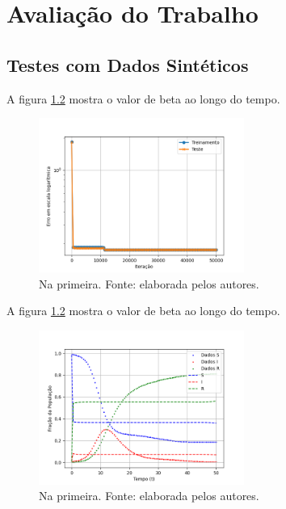 \chapter{Avaliação do Trabalho}
\label{sec-avaliacao}

\section{Testes com Dados Sintéticos}

A figura \ref{fig:compartimentos-sir-semruido} mostra o valor de 
beta ao longo do tempo.

\begin{figure}[htpb]
\centering
\includegraphics[width=0.6\textwidth]{figuras/loss-sir-nonoise.png}
\caption{Na primeira. Fonte: elaborada pelos autores.}
\label{fig:loss-sir-semruido}
\end{figure}


A figura \ref{fig:compartimentos-sir-semruido} mostra o valor de 
beta ao longo do tempo.

\begin{figure}[htpb]
\centering
\includegraphics[width=0.6\textwidth]{figuras/predicted-compartments-sir-nonoise.png}
\caption{Na primeira. Fonte: elaborada pelos autores.}
\label{fig:compartimentos-sir-semruido}
\end{figure}

